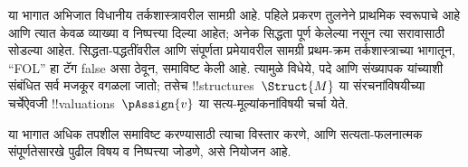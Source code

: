 \documentclass[../../include/open-logic-part]{subfiles}
\begin{document}

\begin{editorial}
  या भागात अभिजात विधानीय तर्कशास्त्रावरील सामग्री आहे. पहिले
  प्रकरण तुलनेने प्राथमिक स्वरूपाचे आहे आणि त्यात केवळ व्याख्या
  व निष्पत्त्या दिल्या आहेत; अनेक सिद्धता पूर्ण केलेल्या नसून त्या
  सरावासाठी सोडल्या आहेत. सिद्धता-पद्धतींवरील आणि संपूर्णता
  प्रमेयावरील सामग्री प्रथम-क्रम तर्कशास्त्राच्या भागातून, ``FOL''
  हा टॅग false असा ठेवून, समाविष्ट केली आहे. त्यामुळे विधेये,
  पदे आणि संख्यापक यांच्याशी संबंधित सर्व मजकूर वगळला जातो;
  तसेच !!{structure}s~$\Struct{M}$ या संरचनांविषयीच्या चर्चेऐवजी
  !!{valuation}s~$\pAssign{v}$ या सत्य-मूल्यांकनांविषयी चर्चा येते.

  या भागात अधिक तपशील समाविष्ट करण्यासाठी त्याचा विस्तार करणे,
  आणि सत्यता-फलनात्मक संपूर्णतेसारखे पुढील विषय व निष्पत्त्या जोडणे,
  असे नियोजन आहे.
\end{editorial}










\OLEndPartHook
\end{document}
